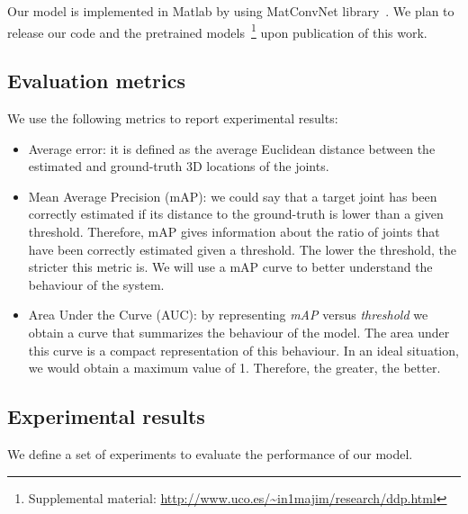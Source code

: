 \documentclass[review,12pt,3p]{elsarticle}
\begin{document}
Our model is implemented in Matlab by using MatConvNet library~\citep{vedaldi2015matconvnet}. We plan to release our code and the pretrained models~\footnote{
Supplemental material: \url{http://www.uco.es/~in1majim/research/ddp.html}
}%
upon publication of this work. 

\subsection{Evaluation metrics} \label{subsec:metrics}
%
We use the following metrics to report experimental results:
\begin{itemize}
\setlength\itemsep{-0.1cm}
    \item Average error: it is defined as the average Euclidean distance between the estimated and ground-truth 3D locations of the joints. 
    \item Mean Average Precision (mAP): we could say that a target joint has been correctly estimated if its distance to the ground-truth is lower than a given threshold. Therefore, mAP gives information about the ratio of joints that have been correctly estimated given a threshold. The lower the threshold, the stricter this metric is. We will use a mAP curve to better understand the behaviour of the system.
    \item Area Under the Curve (AUC): by representing \textit{mAP} versus \textit{threshold} we obtain a curve that summarizes the behaviour of the model. The area under this curve is a compact representation of this behaviour. In an ideal situation, we would obtain a maximum value of 1. Therefore, the greater, the better. 
\end{itemize}

\subsection{Experimental results} \label{subsec:compstudy}
%
We define a set of experiments to evaluate the performance of our model.
%

\end{document}
